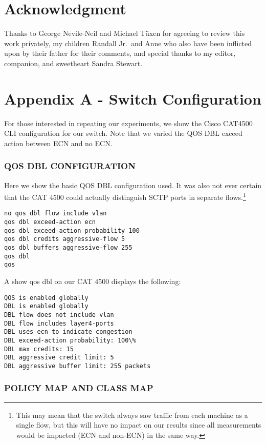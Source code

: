 \documentclass[12pt]{article}
\begin{document}
\section*{Acknowledgment}

Thanks to George Nevile-Neil and Michael T\"uxen for agreeing to review this work privately, my children Randall Jr.~and Anne who also have been inflicted upon by their father for their comments, and special thanks to my editor,
companion, and sweetheart Sandra Stewart.

\section*{Appendix A - Switch Configuration}

For those interested in repeating our experiments, we show the Cisco CAT4500 CLI
configuration for our switch.  Note that we varied the QOS DBL exceed action between
ECN and no ECN.

\subsubsection{QOS DBL CONFIGURATION}
 
Here we show the basic QOS DBL configuration used. It was
also not ever certain that the CAT 4500 could actually distinguish SCTP ports in separate flows.\footnote{This
may mean that the switch always saw traffic from each machine as a single flow, but this will have no impact on
our results since all measurements would be impacted (ECN and non-ECN) in the same way.}
\begin{verbatim}
no qos dbl flow include vlan
qos dbl exceed-action ecn
qos dbl exceed-action probability 100
qos dbl credits aggressive-flow 5
qos dbl buffers aggressive-flow 255
qos dbl   
qos
\end{verbatim}
A show qos dbl on our CAT 4500 displays the following:
\begin{verbatim}
QOS is enabled globally
DBL is enabled globally
DBL flow does not include vlan
DBL flow includes layer4-ports
DBL uses ecn to indicate congestion
DBL exceed-action probability: 100\%
DBL max credits: 15
DBL aggressive credit limit: 5
DBL aggressive buffer limit: 255 packets
\end{verbatim}

\subsubsection {POLICY MAP AND CLASS MAP}
\end{document}

